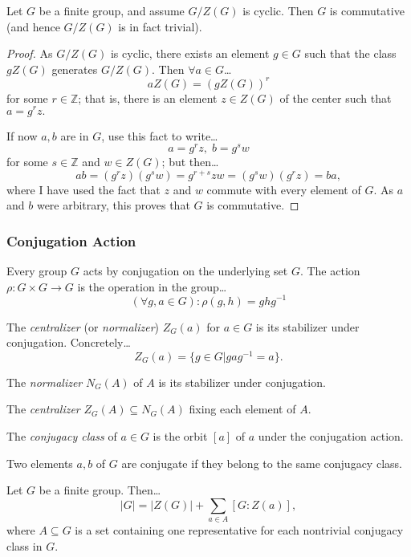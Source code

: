 \begin{lemma}
\label{centerlemma}
Let $G$ be a finite group, and assume $G/Z(G)$ is cyclic. Then $G$ is commutative (and hence
$G/Z(G)$ is in fact trivial).
\end{lemma}

\begin{proof}
As $G/Z(G)$ is cyclic, there exists an element $g \in G$ such that the class $gZ(G)$ generates $G/Z(G)$. Then $\forall a \in G$\dots
$$aZ(G) = (gZ(G))^r$$
for some $r \in \mathbb{Z}$; that is, there is an element $z \in Z(G)$ of the center such that $a = g^rz.$

If now $a,b$ are in $G$, use this fact to write\dots
$$a = g^rz, \; b = g^sw$$
for some $s \in \mathbb{Z}$ and $w \in Z(G)$; but then\dots
$$ab = (g^rz)(g^sw) = g^{r+s}zw = (g^sw)(g^rz) = ba,$$
where I have used the fact that $z$ and $w$ commute with every element of $G$. As $a$ and $b$ were arbitrary, this proves that $G$ is commutative.
\end{proof}

\subsubsection{Conjugation Action}\label{conjugationgroupaction}
Every group $G$ acts by conjugation on the underlying set $G$. The action $\rho : G \times G \rightarrow G$ is
the operation in the group\dots
$$(\forall g,a \in G): \rho(g,h) = ghg^{-1}$$

\label{centralizer}\label{normalizer}
The \emph{centralizer} (or \emph{normalizer}) $Z_G(a)$ for $a \in G$ is its stabilizer under conjugation. Concretely\dots
$$Z_G(a) = \{ g \in G | gag^{-1} = a \}.$$

\noindent The \emph{normalizer} $N_G(A)$ of $A$ is its stabilizer under conjugation.\newline

\noindent The \emph{centralizer} $Z_G(A) \subseteq N_G(A)$ fixing each element of $A$.

\label{conjugacyclass}
The \emph{conjugacy class} of $a \in G$ is the orbit $[a]$ of $a$ under the conjugation action.\newline

\noindent Two elements $a,b$ of $G$ are conjugate if they belong to the same conjugacy class.

\begin{proposition}
\label{classformula}
Let $G$ be a finite group. Then\dots
$$|G| = |Z(G)| + \sum_{a \in A}[G : Z(a)],$$
where $A \subseteq G$ is a set containing one representative for each nontrivial conjugacy class in $G$.
\end{proposition}

